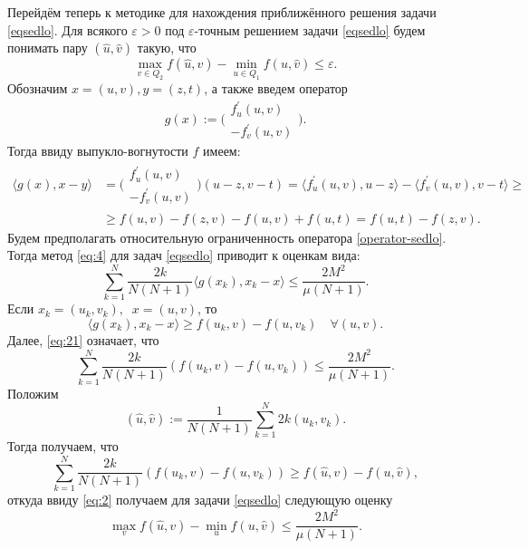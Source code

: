 Перейдём теперь к методике для нахождения приближённого решения задачи \eqref{eqsedlo}. Для всякого $\varepsilon > 0$ под $\varepsilon$-точным решением задачи \eqref{eqsedlo} будем понимать пару $(\widehat{u}, \widehat{v})$ такую, что $$\max_{v \in Q_2} f(\widehat{u}, v) - \min_{u \in Q_1} f(u, \widehat{v}) \leq \varepsilon.$$ Обозначим $x = (u, v), y = (z, t)$, а также введем оператор 
\begin{equation}\label{operator-sedlo}
    g(x) := \Bigg( 
    \begin{aligned}
        f^{'}_{u}(u,v)\\
        -f^{'}_{v}(u,v)
    \end{aligned}
    \Bigg).
\end{equation}
Тогда ввиду выпукло-вогнутости $f$ имеем: 
\begin{equation}
\begin{aligned}
    \langle g(x), x - y \rangle &=
     \Bigg( 
    \begin{aligned}
        f^{'}_{u}(u,v)\\
        -f^{'}_{v}(u,v)
    \end{aligned}
    \Bigg)
     (u - z, v - t)  = \langle f^{'}_{u}(u,v), u - z \rangle - \langle f^{'}_{v}(u,v), v - t \rangle \geq \\&
     \geq f(u, v) - f(z, v) 
    - f(u, v)+ f(u, t)=  f(u,t) - f(z, v).
\end{aligned}
\end{equation}
Будем предполагать относительную ограниченность оператора \eqref{operator-sedlo}. Тогда метод \eqref{eq:4} для задач \eqref{eqsedlo} приводит к оценкам вида:
\begin{equation} \label{eq:21}
    \sum_{k=1}^{N} \frac{2k}{N(N+1)} \langle g(x_k), x_k -x\rangle \leq \frac{2 M^2}{\mu (N+1)}.
\end{equation}
Если $x_k = (u_k, v_k), \;\; x = (u, v)$, то  
\begin{equation}
    \langle g(x_k), x_k -x\rangle \geq f(u_k,v) - f(u, v_k) \quad \forall (u, v).
\end{equation}
Далее, \eqref{eq:21} означает, что 
\begin{equation}
    \sum_{k=1}^{N} \frac{2k}{N(N+1)} (f(u_k,v) - f(u, v_k)) \leq \frac{2M^2}{\mu (N+1)}.
\end{equation}
Положим
\begin{equation}
    (\widehat{u}, \widehat{v}) := \frac{1}{N(N+1)} \sum_{k=1}^{N} 2k (u_k,v_k).
\end{equation}
Тогда получаем, что
\begin{equation}
    \sum_{k=1}^{N} \frac{2k}{N(N+1)} (f(u_k, v) - f(u, v_k)) \geq f(\widehat{u}, v) - f(u, \widehat{v}), 
\end{equation}
откуда ввиду \eqref{eq:2} получаем для задачи \eqref{eqsedlo} следующую оценку
\begin{equation}
    \max_{v} f(\widehat{u}, v) - \min_{u} f(u, \widehat{v}) \leq \frac{2M^2}{\mu (N+1)}.
\end{equation}

